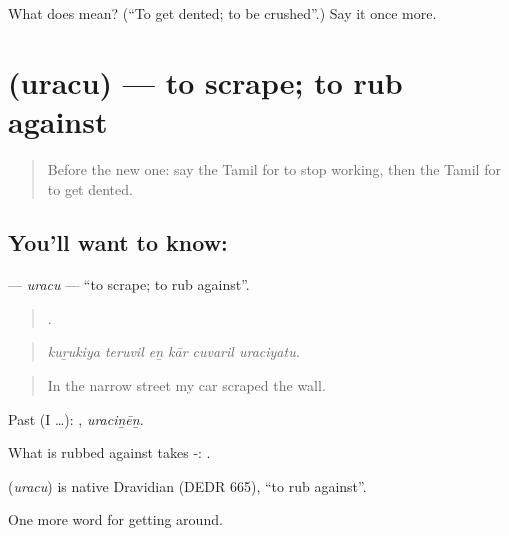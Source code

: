 \begin{tcolorbox}[breakable,colback=teal!4,colframe=teal!35!black,title={Before you move on}]
What does  mean? (\textquotedblleft{}To get dented; to be crushed\textquotedblright{}.) Say it once more.
\end{tcolorbox}
\section[\texorpdfstring{\ta{உரசு} (uracu)}{உரசு (uracu)}]{ (uracu) — to scrape; to rub against}

\label{lesson:TA-C411-uracu}



\begin{quote}
Before the new one: say the Tamil for to stop working, then the Tamil for to get dented.
\end{quote}

\subsection*{You'll want to know: }
\textbf{} — \emph{uracu} — \textquotedblleft{}to scrape; to rub against\textquotedblright{}.

\begin{quote}
     .
\end{quote}

\begin{quote}
\emph{kuṟukiya teruvil eṉ kār cuvaril uraciyatu.}
\end{quote}

\begin{quote}
In the narrow street my car scraped the wall.
\end{quote}

Past (I …): , \emph{uraciṉēṉ}.

What is rubbed against takes -:  .

\begin{cousinweb}
\textbf{} (\emph{uracu}) is native Dravidian (DEDR 665), \textquotedblleft{}to rub against\textquotedblright{}.
\end{cousinweb}

\begin{grammarlens}[title={What you've built}]
One more word for getting around.
\end{grammarlens}

